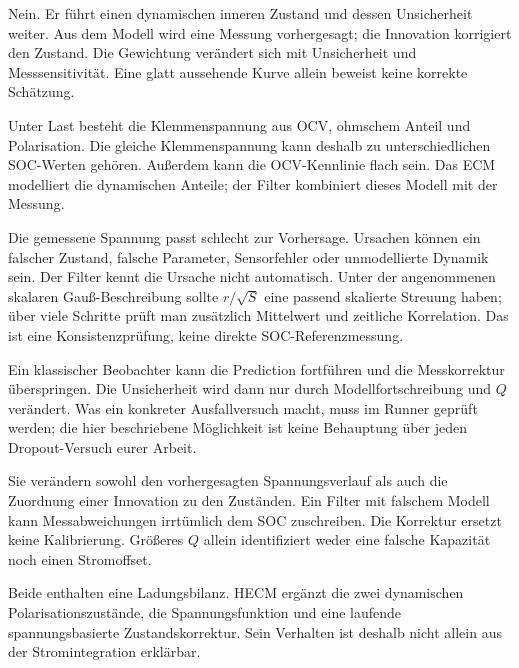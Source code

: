 Nein. Er führt einen dynamischen inneren Zustand und dessen Unsicherheit weiter. Aus dem Modell wird eine Messung vorhergesagt; die Innovation korrigiert den Zustand. Die Gewichtung verändert sich mit Unsicherheit und Messsensitivität. Eine glatt aussehende Kurve allein beweist keine korrekte Schätzung.

Unter Last besteht die Klemmenspannung aus OCV, ohmschem Anteil und Polarisation. Die gleiche Klemmenspannung kann deshalb zu unterschiedlichen SOC-Werten gehören. Außerdem kann die OCV-Kennlinie flach sein. Das ECM modelliert die dynamischen Anteile; der Filter kombiniert dieses Modell mit der Messung.

Die gemessene Spannung passt schlecht zur Vorhersage. Ursachen können ein falscher Zustand, falsche Parameter, Sensorfehler oder unmodellierte Dynamik sein. Der Filter kennt die Ursache nicht automatisch. Unter der angenommenen skalaren Gauß-Beschreibung sollte $r/\sqrt S$ eine passend skalierte Streuung haben; über viele Schritte prüft man zusätzlich Mittelwert und zeitliche Korrelation. Das ist eine Konsistenzprüfung, keine direkte SOC-Referenzmessung.

Ein klassischer Beobachter kann die Prediction fortführen und die Messkorrektur überspringen. Die Unsicherheit wird dann nur durch Modellfortschreibung und $Q$ verändert. Was ein konkreter Ausfallversuch macht, muss im Runner geprüft werden; die hier beschriebene Möglichkeit ist keine Behauptung über jeden Dropout-Versuch eurer Arbeit.

Sie verändern sowohl den vorhergesagten Spannungsverlauf als auch die Zuordnung einer Innovation zu den Zuständen. Ein Filter mit falschem Modell kann Messabweichungen irrtümlich dem SOC zuschreiben. Die Korrektur ersetzt keine Kalibrierung. Größeres $Q$ allein identifiziert weder eine falsche Kapazität noch einen Stromoffset.

Beide enthalten eine Ladungsbilanz. HECM ergänzt die zwei dynamischen Polarisationszustände, die Spannungsfunktion und eine laufende spannungsbasierte Zustandskorrektur. Sein Verhalten ist deshalb nicht allein aus der Stromintegration erklärbar.

